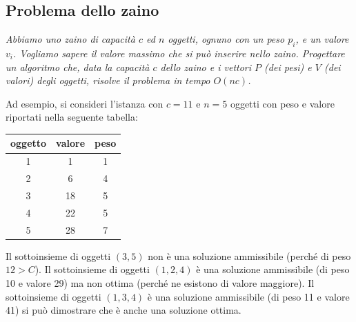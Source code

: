 \subsection{Problema dello zaino}
\textit{Abbiamo uno zaino di capacità $c$ ed $n$ oggetti, ognuno con un peso $p_i$, e un valore $v_i$. Vogliamo sapere il valore massimo che si può inserire nello zaino. Progettare un algoritmo che, data la capacità $c$ dello zaino e i vettori $P$ (dei pesi) e $V$ (dei valori) degli oggetti, risolve il problema in tempo $O(nc)$.}

Ad esempio, si consideri l'istanza con $c=11$ e $n=5$ oggetti con peso e valore riportati nella seguente tabella:
\begin{center}
\begin{tabular}{|c|c|c|}
     \hline \textbf{oggetto} & \textbf{valore} & \textbf{peso}\\\hline
     1&1&1\\\hline
     2&6&4\\\hline
     3&18&5\\\hline
     4&22&5\\\hline
     5&28&7\\\hline
\end{tabular}
\end{center}
Il sottoinsieme di oggetti $(3,5)$ non è una soluzione ammissibile (perché di peso $12 > C$). Il sottoinsieme di oggetti $(1, 2, 4)$ è una soluzione ammissibile (di peso 10 e valore 29) ma non ottima (perché ne esistono di valore maggiore). Il sottoinsieme di oggetti $(1, 3, 4)$ è una soluzione ammissibile (di peso 11 e valore 41) si può dimostrare che è anche una soluzione ottima.

